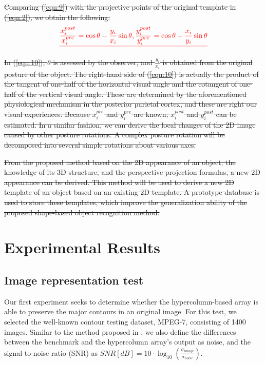 \documentclass[journal]{IEEEtran}
\providecommand{\DIFdel}[1]{{\protect\color{red}\sout{#1}}}                      %
\providecommand{\DIFdelend}{} %
\begin{document}
\DIFdel{Comparing (\ref{eqn:9}) with the projective points of the original template in (\ref{eqn:2}),
we obtain the following.
}\begin{displaymath}\DIFdel{
\frac{x_i^{post}}{x_i^{pre}}=\cos\theta-\frac{y_i}{x_i}\sin\theta,
\frac{y_i^{post}}{y_i^{pre}}=\cos\theta+\frac{x_i}{y_i}\sin\theta
\label{eqn:10}
}\end{displaymath}

\DIFdel{In (\ref{eqn:10}), $\theta$ is assessed by the observer, 
and $\frac{y_i}{x_i}$ is obtained from the original posture of the object. 
The right-hand side of (\ref{eqn:10}) is actually the product of the tangent of one-half of the horizontal visual angle and the cotangent of one-half of the vertical visual angle. 
These are determined by the aforementioned physiological mechanism in the posterior parietal cortex, 
and these are right our visual experiences. 
Because $x_i^{pre}$ and $y_i^{pre}$ are known, $x_i^{post}$ and $y_i^{post}$ can be estimated. 
In a similar fashion, we can derive the local changes of the 2D image caused by other posture rotations. 
A complex posture rotation will be decomposed into several simple rotations about various axes.
}%

\DIFdel{From the proposed method based on the 2D appearance of an object, 
the knowledge of its 3D structure, and the perspective projection formulas, 
a new 2D appearance can be derived. 
This method will be used to derive a new 2D template of an object based on an existing 2D template. 
A prototype database is used to store these templates, 
which improve the generalization ability of the proposed shape-based object recognition method.
}%

\DIFdelend \section{Experimental Results}

\subsection{Image representation test}

Our first experiment seeks to determine whether the hypercolumn-based array is able to preserve the major contours in an original image. 
For this test, we selected the well-known contour testing dataset, MPEG-7, consisting of 1400 images. 
Similar to the method proposed in \cite{russ1995}, 
we also define the differences between the benchmark and the hypercolumn array's output as noise, 
and the signal-to-noise ratio (SNR) as $SNR[dB]=10\cdot\log_10(\frac{\sigma_{image}}{\sigma_{noise}})$.
\end{document}
